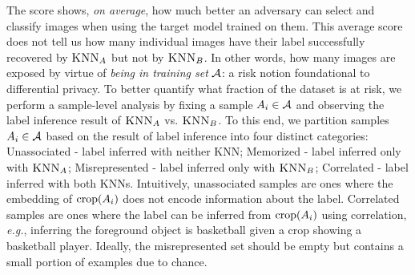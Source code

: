 The \dejavu score shows, \emph{on average}, how much better an adversary can select and classify images when using the target model trained on them. 
This average score does not tell us how many individual images have their label successfully recovered by $\textsc{KNN}_A$ but not by $\textsc{KNN}_B$. In other words, how many images are exposed by virtue of \emph{being in training set} $\mathcal{A}$: a risk notion foundational to differential privacy. 
To better quantify what fraction of the dataset is at risk, we perform a sample-level analysis by fixing a sample $A_i \in \mathcal{A}$ and observing the label inference result of $\textsc{KNN}_A$ vs. $\textsc{KNN}_B$.
To this end, we partition samples $A_i \in \mathcal{A}$ based on the result of label inference into four distinct categories: Unassociated - label inferred with neither KNN; Memorized - label inferred only with $\textsc{KNN}_A$; Misrepresented - label inferred only with $\textsc{KNN}_B$; Correlated - label inferred with both KNNs. 
Intuitively, unassociated samples are ones where the embedding of $\mathrm{crop}({A_i})$ does not encode information about the label. Correlated samples are ones where the label can be inferred from $\mathrm{crop}({A_i})$ using correlation, \emph{e.g.}, inferring the foreground object is basketball given a crop showing a basketball player. Ideally, the misrepresented set should be empty but contains a small portion of examples due to chance.
